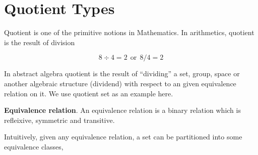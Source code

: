 \chapter{Quotient Types}
\label{qt}













Quotient is one of the primitive notions in Mathematics. 
In arithmetics, quotient is the result of division

$$8 \div 4 = 2 ~~ \text{or}~~ 8/4 = 2$$


In abstract algebra quotient is the result of ``dividing'' a set, group, space or another algebraic structure (dividend) with respect to an given equivalence relation on it. We use quotient set as an example here.

\begin{definition}
\textbf{Equivalence relation}.
An equivalence relation is a binary
relation which is refleixive, symmetric and transitive.
\end{definition}

Intuitively, given any equivalence relation, a set can be partitioned into
some equivalence classes,

